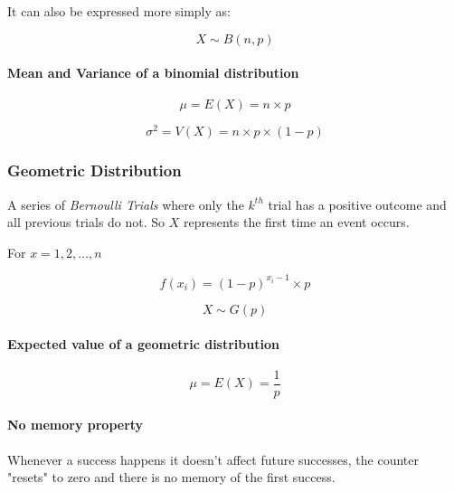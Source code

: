 \documentclass[12pt]{article}
\begin{document}
	\noindent It can also be expressed more simply as:
	
	\begin{equation*}
	X\sim B(n, p)
	\end{equation*}
	
	\paragraph{Mean and Variance of a binomial distribution}

	\begin{equation*}
		\mu = E(X) = n\times p
	\end{equation*}
	
	\begin{equation*}
		\sigma^2 = V(X) = n\times p\times (1-p)
	\end{equation*}
	
	\newpage
	\subsubsection{Geometric Distribution}
	
	A series of \emph{Bernoulli Trials} where only the \(k^{th}\) trial has a positive outcome and all previous trials do not. So \(X\) represents the first time an event occurs.
	\newline
	
	\noindent For \(x=1,2,\ldots ,n\)
	
	\begin{equation*}
		f(x_i) = (1-p)^{x_i-1}\times p
	\end{equation*}
	
	\begin{equation*}
		X\sim G(p)
	\end{equation*}
	
	\paragraph{Expected value of a geometric distribution}
	
	\begin{equation*}
		\mu = E(X) = \frac{1}{p}
	\end{equation*}
	
	\paragraph{No memory property}
	
	Whenever a success happens it doesn't affect future successes, the counter "resets" to zero and there is no memory of the first success.
	
\end{document}

